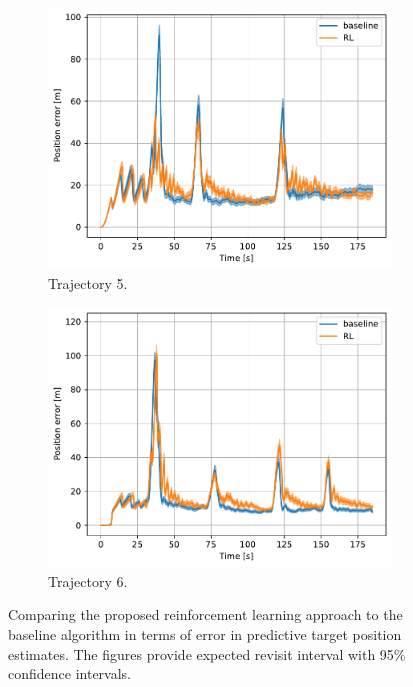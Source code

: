 \documentclass[english, 12pt, a4paper, elec, utf8, a-1b, online]{aaltothesis}
\begin{document}
\begin{figure}[htb]
\begin{subfigure}[b]{0.45\textwidth}
        \centering
        \includegraphics[width=\linewidth]{figures/benchmark/Simulations/mean_position_error4.pdf}
        \caption{Trajectory 5.}
        \label{fig:PE_T5}
    \end{subfigure}
    \hfill
    \begin{subfigure}[b]{0.45\textwidth}
        \centering
        \includegraphics[width=\linewidth]{figures/benchmark/Simulations/mean_position_error5.pdf}
        \caption{Trajectory 6.}
        \label{fig:PE_T6}
    \end{subfigure}
    \caption{Comparing the proposed reinforcement learning approach to the baseline algorithm in terms of error in predictive target position estimates.
    The figures provide expected revisit interval with 95\% confidence intervals.}
    \label{fig:position_error_comparison}
\end{figure}
\end{document}
